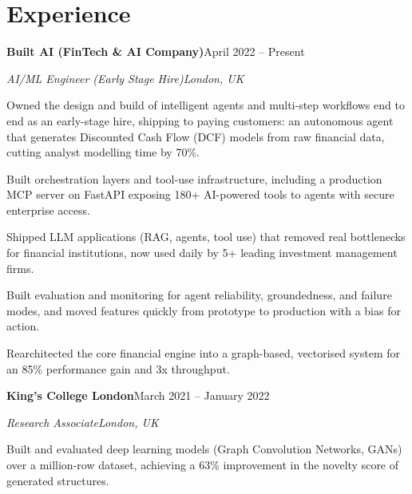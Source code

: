 \documentclass[10pt,a4paper]{article}
\newcommand{\entry}[4]{%
  {\color{company}\bfseries #1}\hfill {\color{muted}#2}\par
  \vspace{1pt}
  {\itshape #3}\hfill {\color{muted}\itshape #4}\par
  \vspace{3pt}%
}
\begin{document}
\section{Experience}
\entry{Built AI (FinTech \& AI Company)}{April 2022 -- Present}{AI/ML Engineer (Early Stage Hire)}{London, UK}
\begin{tight}
  \item Owned the design and build of intelligent agents and multi-step workflows end to end as an early-stage hire, shipping to paying customers: an autonomous agent that generates Discounted Cash Flow (DCF) models from raw financial data, cutting analyst modelling time by 70\%.
  \item Built orchestration layers and tool-use infrastructure, including a production MCP server on FastAPI exposing 180+ AI-powered tools to agents with secure enterprise access.
  \item Shipped LLM applications (RAG, agents, tool use) that removed real bottlenecks for financial institutions, now used daily by 5+ leading investment management firms.
  \item Built evaluation and monitoring for agent reliability, groundedness, and failure modes, and moved features quickly from prototype to production with a bias for action.
  \item Rearchitected the core financial engine into a graph-based, vectorised system for an 85\% performance gain and 3x throughput.
\end{tight}

\entry{King's College London}{March 2021 -- January 2022}{Research Associate}{London, UK}
\begin{tight}
  \item Built and evaluated deep learning models (Graph Convolution Networks, GANs) over a million-row dataset, achieving a 63\% improvement in the novelty score of generated structures.
\end{tight}

\end{document}
